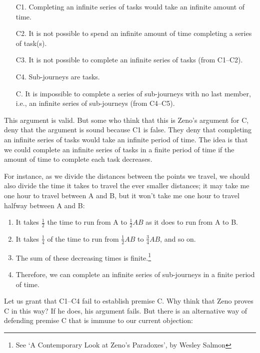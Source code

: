\documentclass[oneside]{article}
\begin{document}
\begin{enumerate}
\item[C1.] Completing an infinite series of tasks would take an infinite
  amount of time.
\item[C2.] It is not possible to spend an infinite amount of time completing
 a series of task(s).
\item[C3.] It is not possible to complete an infinite series of
  tasks (from C1--C2).
 \item[C4.] Sub-journeys are tasks.
 \item[C.] It is impossible to complete a series of sub-journeys with no last
  member, i.e., an infinite series of sub-journeys (from C4--C5).
\end{enumerate}
This argument is valid.  But some who think that this is Zeno's argument for C, deny that the argument is sound because C1 is false. They deny that completing an infinite series of tasks would take an infinite period of time. The idea is that we could complete an infinite series of tasks in a finite period of time if the amount of time to complete each task decreases. 

For instance,  as we divide the distances between the
points we travel, we should also divide the time it takes to travel the
ever smaller distances; it may take me one hour to travel between A and B, but it won't take me one hour to travel halfway between A and B:

\begin{enumerate}
\item
  It takes \(\frac{1}{2}\) the time to run from A to \(\frac{1}{2}AB\)
  as it does to run from A to B.
\item
  It takes \(\frac{1}{4}\) of the time to run from \(\frac{1}{2}AB\) to
  \(\frac{3}{4}AB\), and so on.
\item
  The sum of these decreasing times is finite.\footnote{See `A
    Contemporary Look at Zeno's Paradoxes', by Wesley Salmon}
\item
  Therefore, we can complete an infinite series of sub-journeys in a
  finite period of time.
\end{enumerate}
Let us grant that C1--C4 fail to establish premise C.  Why think that Zeno proves C in this way? If he does, his argument fails. But there is an
alternative way of defending premise C that is immune to our current objection:
\end{document}
